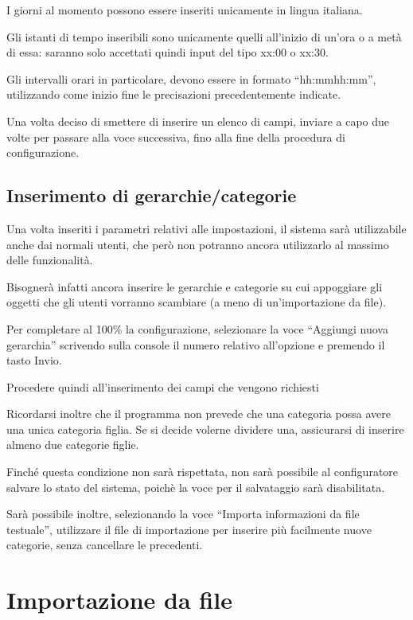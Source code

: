 I giorni al momento possono essere inseriti unicamente in lingua italiana.

Gli istanti di tempo inseribili sono unicamente quelli all'inizio di un'ora o a metà di essa: saranno solo accettati quindi input del tipo xx:00 o xx:30.

Gli intervalli orari in particolare, devono essere in formato ``hh:mm\textendash hh:mm'', utilizzando come inizio fine le precisazioni precedentemente indicate.

Una volta deciso di smettere di inserire un elenco di campi, inviare a capo due volte per passare alla voce successiva, fino alla fine della procedura di configurazione.

\subsection{Inserimento di gerarchie/categorie}

Una volta inseriti i parametri relativi alle impostazioni, il sistema sarà utilizzabile anche dai normali utenti, che però non potranno ancora utilizzarlo al massimo delle funzionalità.

Bisognerà infatti ancora inserire le gerarchie e categorie su cui appoggiare gli oggetti che gli utenti vorranno scambiare (a meno di un'importazione da file).

Per completare al 100\% la configurazione, selezionare la voce ``Aggiungi nuova gerarchia'' scrivendo sulla console il numero relativo all'opzione e premendo il tasto Invio.

Procedere quindi all'inserimento dei campi che vengono richiesti 

Ricordarsi inoltre che il programma non prevede che una categoria possa avere una unica categoria figlia. Se si decide volerne dividere una, assicurarsi di inserire almeno due categorie figlie.

Finché questa condizione non sarà rispettata, non sarà possibile al configuratore salvare lo stato del sistema, poichè la voce per il salvataggio sarà disabilitata.

Sarà possibile inoltre, selezionando la voce ``Importa informazioni da file testuale'', utilizzare il file di importazione per inserire più facilmente nuove categorie, senza cancellare le precedenti.

\pagebreak
\section{Importazione da file}

